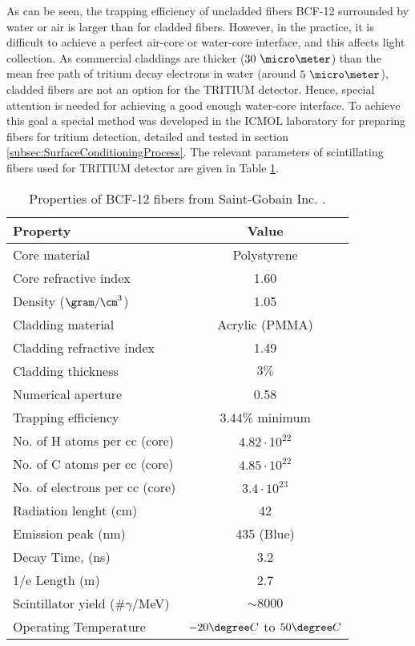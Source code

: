 As can be seen, the trapping efficiency of uncladded fibers BCF-12 surrounded by water or air is larger than for cladded fibers. However, in the practice, it is difficult to achieve a perfect air-core or water-core interface, and this affects light collection. As commercial claddings are thicker ($30~\micro \meter$) than the mean free path of tritium decay electrons in water (around $5~\micro\meter$), cladded fibers are not an option for the TRITIUM detector. Hence, special attention is needed for achieving a good enough water-core interface. To achieve this goal a special method was developed in the ICMOL laboratory for preparing fibers for tritium detection, detailed and tested in section \ref{subsec:SurfaceConditioningProcess}. The relevant parameters of scintillating fibers used for TRITIUM detector are given in Table \ref{tab:ParametersFibersBCF12}.

\begin{table}[htbp]
\centering{}%
\begin{tabular}{lc}
\toprule 
Property & Value \tabularnewline
\midrule
\midrule 
Core material & Polystyrene \tabularnewline
Core refractive index & 1.60 \tabularnewline
Density ($\gram/\cm^3$) & 1.05 \tabularnewline
Cladding material & Acrylic (PMMA) \tabularnewline
Cladding refractive index & 1.49 \tabularnewline
Cladding thickness & $3\%$ \tabularnewline
Numerical aperture & 0.58 \tabularnewline
Trapping efficiency & 3.44\% minimum \tabularnewline
No. of H atoms per cc (core) & $4.82 \cdot{} 10^{22}$ \tabularnewline
No. of C atoms per cc (core) & $4.85 \cdot{} 10^{22}$ \tabularnewline
No. of electrons per cc (core) & $3.4 \cdot{} 10^{23}$ \tabularnewline
Radiation lenght (cm) & 42 \tabularnewline
Emission peak (nm) & 435 (Blue) \tabularnewline
Decay Time, (ns) & 3.2 \tabularnewline
1/e Length (m) & 2.7 \tabularnewline
Scintillator yield (\#$\gamma$/MeV) & $\sim 8000$ \tabularnewline
Operating Temperature & $-20\degree C$ to $50\degree C$ \tabularnewline
\bottomrule
\end{tabular}
\caption{Properties of BCF-12 fibers from Saint-Gobain Inc. \cite{DataSheetBCF12Fiber}.}
\label{tab:ParametersFibersBCF12}
\end{table}